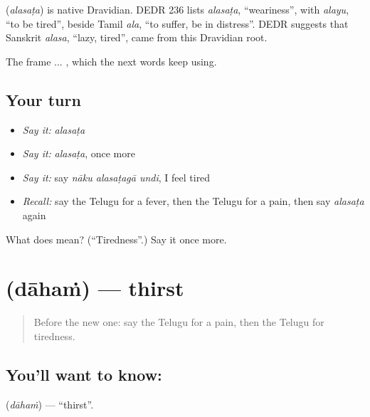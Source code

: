 \begin{cousinweb}
\textbf{} (\emph{alasaṭa}) is native Dravidian. DEDR 236 lists \emph{alasaṭa}, \textquotedblleft{}weariness\textquotedblright{}, with \emph{alayu}, \textquotedblleft{}to be tired\textquotedblright{}, beside Tamil \emph{ala}, \textquotedblleft{}to suffer, be in distress\textquotedblright{}. DEDR suggests that Sanskrit \emph{alasa}, \textquotedblleft{}lazy, tired\textquotedblright{}, came from this Dravidian root.
\end{cousinweb}

\begin{grammarlens}[title={What you've built}]
The frame  ...  , which the next words keep using.
\end{grammarlens}

\subsection*{Your turn}
\begin{itemize}
\raggedright
  \item \emph{Say it:} \emph{alasaṭa}
  \item \emph{Say it:} \emph{alasaṭa}, once more
  \item \emph{Say it:} say \emph{nāku alasaṭagā undi}, I feel tired
  \item \emph{Recall:} say the Telugu for a fever, then the Telugu for a pain, then say \emph{alasaṭa} again
\end{itemize}

\begin{tcolorbox}[breakable,colback=teal!4,colframe=teal!35!black,title={Before you move on}]
What does  mean? (\textquotedblleft{}Tiredness\textquotedblright{}.) Say it once more.
\end{tcolorbox}
\section[\texorpdfstring{\te{దాహం} (dāhaṁ)}{దాహం (dāhaṁ)}]{ (dāhaṁ) — thirst}

\label{lesson:TE-C84-thirst}



\begin{quote}
Before the new one: say the Telugu for a pain, then the Telugu for tiredness.
\end{quote}

\subsection*{You'll want to know: }
\textbf{} (\emph{dāhaṁ}) — \textquotedblleft{}thirst\textquotedblright{}.

